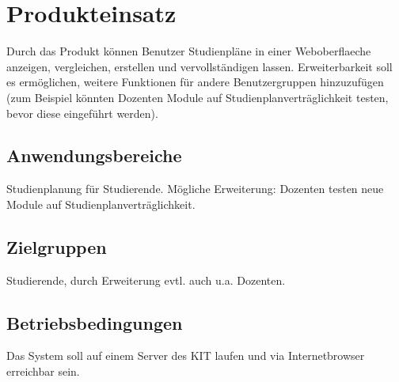 \section{Produkteinsatz}
Durch das Produkt können \gls{Benutzer} Studienpläne in einer \gls{Weboberflaeche} anzeigen, vergleichen, erstellen und vervollständigen lassen. Erweiterbarkeit soll es ermöglichen, weitere Funktionen für andere Benutzergruppen hinzuzufügen (zum Beispiel könnten Dozenten Module auf Studienplanverträglichkeit testen, bevor diese eingeführt werden). 

\subsection{Anwendungsbereiche}
Studienplanung für Studierende. Mögliche Erweiterung: Dozenten testen neue Module auf Studienplanverträglichkeit.

\subsection{Zielgruppen}
Studierende, durch Erweiterung evtl. auch u.a. Dozenten.
\subsection{Betriebsbedingungen}
Das System soll auf einem Server des \gls{KIT} laufen und via \gls{Internetbrowser} erreichbar sein.